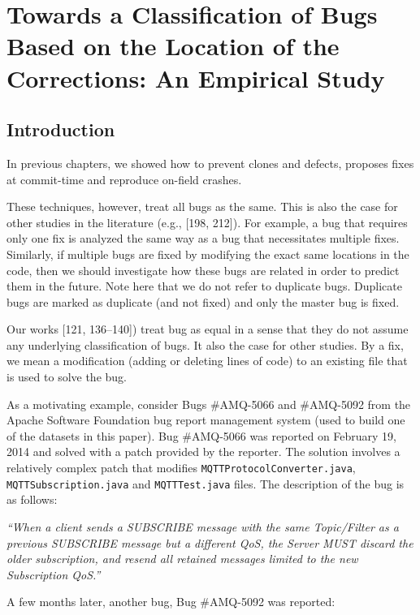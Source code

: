 \documentclass[12pt]{report}
\begin{document}
\chapter{Towards a Classification of Bugs Based on the Location of the
Corrections: An Empirical
Study}\label{towards-a-classification-of-bugs-based-on-the-location-of-the-corrections-an-empirical-study}

\section{Introduction}\label{introduction-6}

In previous chapters, we showed how to prevent clones and defects,
proposes fixes at commit-time and reproduce on-field crashes.

These techniques, however, treat all bugs as the same. This is also the
case for other studies in the literature (e.g., {[}198, 212{]}). For
example, a bug that requires only one fix is analyzed the same way as a
bug that necessitates multiple fixes. Similarly, if multiple bugs are
fixed by modifying the exact same locations in the code, then we should
investigate how these bugs are related in order to predict them in the
future. Note here that we do not refer to duplicate bugs. Duplicate bugs
are marked as duplicate (and not fixed) and only the master bug is
fixed.

Our works {[}121, 136--140{]}) treat bug as equal in a sense that they
do not assume any underlying classification of bugs. It also the case
for other studies. By a fix, we mean a modification (adding or deleting
lines of code) to an existing file that is used to solve the bug.

As a motivating example, consider Bugs \#AMQ-5066 and \#AMQ-5092 from
the Apache Software Foundation bug report management system (used to
build one of the datasets in this paper). Bug \#AMQ-5066 was reported on
February 19, 2014 and solved with a patch provided by the reporter. The
solution involves a relatively complex patch that modifies
\lstinline!MQTTProtocolConverter.java!,
\lstinline!MQTTSubscription.java! and \lstinline!MQTTTest.java! files.
The description of the bug is as follows:

\emph{``When a client sends a SUBSCRIBE message with the same
Topic/Filter as a previous SUBSCRIBE message but a different QoS, the
Server MUST discard the older subscription, and resend all retained
messages limited to the new Subscription QoS.''}

A few months later, another bug, Bug \#AMQ-5092 was reported:
\end{document}
